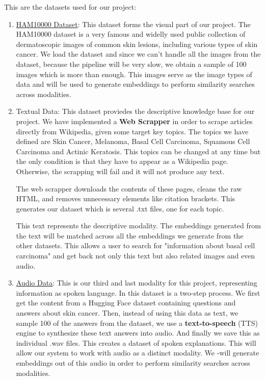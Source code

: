 \documentclass[12pt]{article}
\begin{document}
This are the datasets used for our project:
\begin{enumerate}
    \item \href{https://huggingface.co/datasets/abaryan/ham10000_bbox}{HAM10000 Dataset}: This dataset forms the visual part of our project. The HAM10000 dataset is a very famous and widelly used public collection of dermatoscopic images of common skin lesions, including various types of skin cancer. We load the dataset and since we can't handle all the images from the dataset, because the pipeline will be very slow, we obtain a sample of 100 images which is more than enough. This images serve as the image types of data and will be used to generate embeddings to perform similarity searches across modalities.

    \item Textual Data: This dataset proviedes the descriptive knowledge base for our project. We have implemented a \textbf{Web Scrapper} in order to scrape articles directly from Wikipedia, given some target key topics. The topics we have defined are Skin Cancer, Melanoma, Basal Cell Carcinoma, Squamous Cell Carcinoma and Actinic Keratosis. This topics can be changed at any time but the only condition is that they have to appear as a Wikipedia page. Otherwise, the scrapping will fail and it will not produce any text. 
    
    The web scrapper downloads the contents of these pages, cleans the raw HTML, and removes unnecessary elements like citation brackets. This generates our dataset which is several .txt files, one for each topic. 
    
    This text represents the descriptive modality. The embeddings generated from the text will be matched across all the embeddings we generate from the other datasets. This allows a user to search for "information about basal cell carcinoma" and get back not only this text but also related images and even audio.

    \item \href{https://huggingface.co/datasets/Moaaz55/skin_cancer_questions_answers}{Audio Data}: This is our third and last modality for this project, representing information as spoken language. In this dataset is a two-step process. We first get the content from a Hugging Face dataset containing questions and answers about skin cancer. Then, instead of using this data as text, we sample 100 of the answers from the dataset, we use a \textbf{text-to-speech} (TTS) engine to synthesize these text answers into audio. And finally we save this as individual .wav files. This creates a dataset of spoken explanations. This will allow our system to work with audio as a distinct modality. We -will generate embeddings out of this audio in order to perform similarity searches across modalities.
\end{enumerate}
\end{document}
